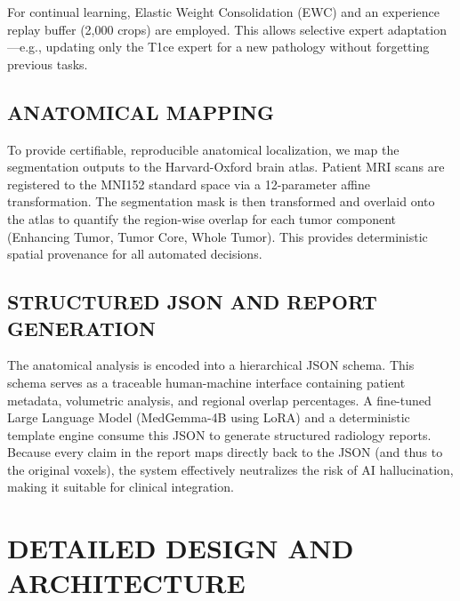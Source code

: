 \documentclass[12pt, a4paper]{report}
\begin{document}
For continual learning, Elastic Weight Consolidation (EWC) and an experience replay buffer (2,000 crops) are employed. This allows selective expert adaptation---e.g., updating only the T1ce expert for a new pathology without forgetting previous tasks.

\section{ANATOMICAL MAPPING}
To provide certifiable, reproducible anatomical localization, we map the segmentation outputs to the Harvard-Oxford brain atlas. Patient MRI scans are registered to the MNI152 standard space via a 12-parameter affine transformation. The segmentation mask is then transformed and overlaid onto the atlas to quantify the region-wise overlap for each tumor component (Enhancing Tumor, Tumor Core, Whole Tumor). This provides deterministic spatial provenance for all automated decisions.

\section{STRUCTURED JSON AND REPORT GENERATION}
The anatomical analysis is encoded into a hierarchical JSON schema. This schema serves as a traceable human-machine interface containing patient metadata, volumetric analysis, and regional overlap percentages. A fine-tuned Large Language Model (MedGemma-4B using LoRA) and a deterministic template engine consume this JSON to generate structured radiology reports. Because every claim in the report maps directly back to the JSON (and thus to the original voxels), the system effectively neutralizes the risk of AI hallucination, making it suitable for clinical integration.

\chapter{DETAILED DESIGN AND ARCHITECTURE}
\end{document}
